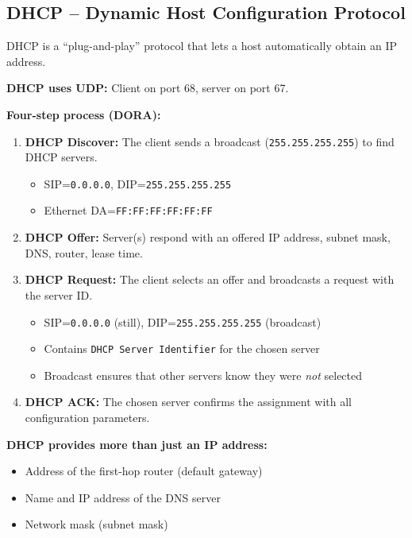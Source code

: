 \subsection{DHCP -- Dynamic Host Configuration Protocol}

\begin{exambox}
DHCP is a ``plug-and-play'' protocol that lets a host automatically obtain an IP address.

\textbf{DHCP uses UDP:} Client on port 68, server on port 67.

\textbf{Four-step process (DORA):}
\begin{enumerate}[noitemsep]
    \item \textbf{DHCP Discover:} The client sends a broadcast (\texttt{255.255.255.255}) to find DHCP servers.
    \begin{itemize}[noitemsep]
        \item SIP=\texttt{0.0.0.0}, DIP=\texttt{255.255.255.255}
        \item Ethernet DA=\texttt{FF:FF:FF:FF:FF:FF}
    \end{itemize}

    \item \textbf{DHCP Offer:} Server(s) respond with an offered IP address, subnet mask, DNS, router, lease time.

    \item \textbf{DHCP Request:} The client selects an offer and broadcasts a request with the server ID.
    \begin{itemize}[noitemsep]
        \item SIP=\texttt{0.0.0.0} (still), DIP=\texttt{255.255.255.255} (broadcast)
        \item Contains \texttt{DHCP Server Identifier} for the chosen server
        \item Broadcast ensures that other servers know they were \emph{not} selected
    \end{itemize}

    \item \textbf{DHCP ACK:} The chosen server confirms the assignment with all configuration parameters.
\end{enumerate}

\medskip
\textbf{DHCP provides more than just an IP address:}
\begin{itemize}[noitemsep]
    \item Address of the first-hop router (default gateway)
    \item Name and IP address of the DNS server
    \item Network mask (subnet mask)
\end{itemize}


\end{exambox}
